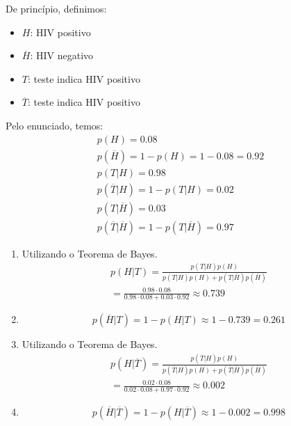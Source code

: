 \item
  De princípio, definimos:
  \begin{itemize}
    \item $H$: HIV positivo

    \item $\overline{H}$: HIV negativo
    \item $T$: teste indica HIV positivo
    \item $\overline{T}$: teste indica HIV positivo
  \end{itemize}

  Pelo enunciado, temos:
  \[\begin{array}{l}
  p(H) = 0.08\\
  p(\overline{H}) = 1 - p(H) = 1 - 0.08 = 0.92\\
  p(T|H) = 0.98\\
  p(\overline{T}|H) = 1-p(T|H) = 0.02\\
  p(T|\overline{H}) = 0.03\\
  p(\overline{T}|\overline{H}) = 1-p(T|\overline{H}) = 0.97
  \end{array}\]

  \begin{enumerate}
    \item
    Utilizando o Teorema de Bayes.
    \[\begin{array}{l}
    p(H|T) = \frac{{p(T|H)p(H)}}{{p(T|H)p(H) + p(T|\overline{H})p(\overline{H})}}\\
     = \frac{{0.98 \cdot 0.08}}{{0.98 \cdot 0.08 + 0.03 \cdot 0.92}} \approx 0.739
    \end{array}\]

    \item
    \[p(\overline{H}|T) = 1 - p(H|T) \approx 1 - 0.739 = 0.261\]

    \item
    Utilizando o Teorema de Bayes.
    \[\begin{array}{l}
    p(H|\overline {T}) = \frac{{p(\overline {T}|H)p(H)}}{{p(\overline {T}|H)p(H) + p(\overline {T}|\overline {H})p(\overline {H})}}\\
     = \frac{{0.02 \cdot 0.08}}{{0.02 \cdot 0.08 + 0.97 \cdot 0.92}} \approx 0.002
    \end{array}\]

    \item
    \[p(\overline{H}|\overline{T}) = 1 - p(H|\overline{T}) \approx 1 - 0.002 = 0.998\]

  \end{enumerate}
